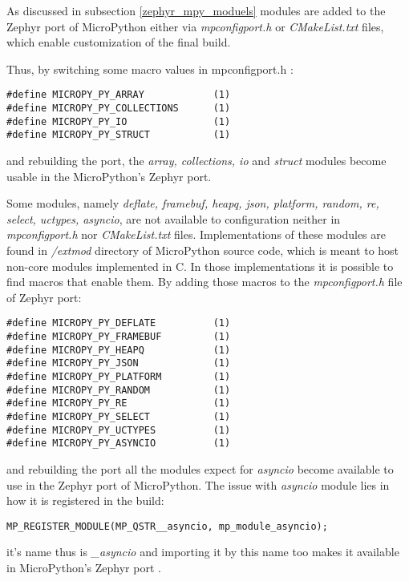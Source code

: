 \documentclass[twoside, 12pt]{article}
\begin{document}
As discussed in subsection \ref{zephyr_mpy_moduels} modules are added to the Zephyr port of 
MicroPython either via \textit{mpconfigport.h} or \textit{CMakeList.txt} files, which enable 
customization of the final build.

Thus, by switching some macro values in mpconfigport.h :
\begin{lstlisting}[caption={Extending Zephyr port modules support, Part 1},breaklines=true]
#define MICROPY_PY_ARRAY            (1)
#define MICROPY_PY_COLLECTIONS      (1)
#define MICROPY_PY_IO               (1)
#define MICROPY_PY_STRUCT           (1)
\end{lstlisting}
and rebuilding the port, the \textit{array, collections, io} and \textit{struct} modules 
become usable in the MicroPython's Zephyr port.

Some modules, namely \textit{deflate, framebuf, heapq, json, platform, random, re, select, uctypes, asyncio},
are not available to configuration neither in \textit{mpconfigport.h} nor 
\textit{CMakeList.txt} files. Implementations of these modules are found in \textit{/extmod} 
directory of MicroPython source code, which is meant to host non-core modules implemented in 
C. In those implementations it is possible to find macros that enable them. By adding those 
macros to the \textit{mpconfigport.h} file of Zephyr port:
\begin{lstlisting}[caption={Extending Zephyr port modules support, Part 2},breaklines=true]
#define MICROPY_PY_DEFLATE          (1)
#define MICROPY_PY_FRAMEBUF         (1)
#define MICROPY_PY_HEAPQ            (1)
#define MICROPY_PY_JSON             (1)
#define MICROPY_PY_PLATFORM         (1)
#define MICROPY_PY_RANDOM           (1)
#define MICROPY_PY_RE               (1)
#define MICROPY_PY_SELECT           (1)
#define MICROPY_PY_UCTYPES          (1)
#define MICROPY_PY_ASYNCIO          (1)
\end{lstlisting}
and rebuilding the port all the modules expect for \textit{asyncio} become available to use 
in the Zephyr port of MicroPython. The issue with \textit{asyncio} module lies in how it is 
registered in the build:
\begin{lstlisting}[caption=Asyncio module in MicroPython's Zephyr port, breaklines=true]
MP_REGISTER_MODULE(MP_QSTR__asyncio, mp_module_asyncio);
\end{lstlisting}
it's name thus is \textit{\_asyncio} and importing it by this name too makes it available in 
MicroPython's Zephyr port .
\end{document}
